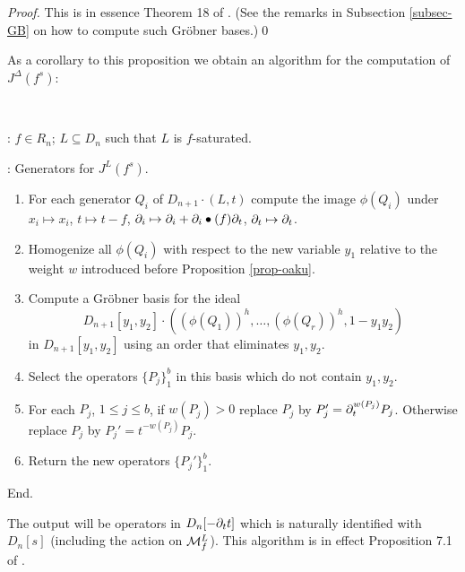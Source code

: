 \begin{proof}
This is in essence Theorem 18 of \cite{DM:Oa2}. (See the remarks 
in Subsection \ref{subsec-GB} on how to compute such Gr\"obner
bases.)\qed 
\end{proof}

As a corollary to this proposition we obtain an algorithm for the
computation of $J^\Delta(f^s)$:

\begin{alg}
~

: $f\in R_n$; $L\subseteq D_n$ such that $L$ is 
$f$-saturated.

: Generators for $J^L(f^s)$.

\begin{enumerate}
\item For each generator $Q_i$ of $D_{n+1}\cdot (L,t)$ 
compute the image $\phi(Q_i)$
under $x_i\mapsto
x_i$, $t\mapsto t-f$, $\partial_i\mapsto \partial_i+\partial_i\bullet(f)\partial_t$,
$\partial_t\mapsto\partial_t$.

\item Homogenize all $\phi(Q_i)$ with respect to the new variable
$y_1$ relative to the weight $w$ introduced before Proposition \ref{prop-oaku}.

\item Compute a Gr\"obner basis for the ideal
\[
D_{n+1}[y_1,y_2]\cdot((\phi(Q_1))^h, \ldots, (\phi(Q_r))^h, 1-y_1y_2)
\]
in $D_{n+1}[y_1,y_2]$
using an order that eliminates $y_1,y_2$.

\item Select the operators $\{ P_j\}_1^b$ in this basis which do not
contain $y_1, y_2$. 

\item For each $P_j$, $1\le j\le b$, if $w(P_j)>0$ replace $P_j$ by
$P_j'=\partial_t^{w(P_j)}P_j$. Otherwise replace $P_j$ by
$P_j'=t^{-w(P_j)}P_j$. 

\item Return the new operators $\{P_j'\}_1^b$.
\end{enumerate}
End.
\end{alg}
The output will be operators in $D_n[-\partial_tt]$ which is naturally
identified with $D_n[s]$ (including the action on ${\mathcal M}^L_f$).
This algorithm is in effect Proposition 7.1 of \cite{DM:Oa3}.

